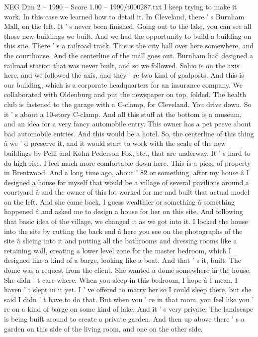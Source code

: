 \begin{textsample}{NEG Dim 2 – 1990 – Score 1.00 – 1990/t000287.txt}
I keep trying to make it work.
In this case we learned how to detail it.
In Cleveland, there ' s Burnham Mall, on the left.
It ' s never been finished.
Going out to the lake, you can see all those new buildings we built.
And we had the opportunity to build a building on this site.
There ' s a railroad track.
This is the city hall over here somewhere, and the courthouse.
And the centerline of the mall goes out.
Burnham had designed a railroad station that was never built, and so we followed.
Sohio is on the axis here, and we followed the axis, and they ' re two kind of goalposts.
And this is our building, which is a corporate headquarters for an insurance company.
We collaborated with Oldenburg and put the newspaper on top, folded.
The health club is fastened to the garage with a C-clamp, for Cleveland.
You drive down.
So it ' s about a 10-story C-clamp.
And all this stuff at the bottom is a museum, and an idea for a very fancy automobile entry.
This owner has a pet peeve about bad automobile entries.
And this would be a hotel.
So, the centerline of this thing â we ' d preserve it, and it would start to work with the scale of the new buildings by Pelli and Kohn Pederson Fox, etc., that are underway.
It ' s hard to do high-rise.
I feel much more comfortable down here.
This is a piece of property in Brentwood.
And a long time ago, about ' 82 or something, after my house â I designed a house for myself that would be a village of several pavilions around a courtyard â and the owner of this lot worked for me and built that actual model on the left.
And she came back, I guess wealthier or something â something happened â and asked me to design a house for her on this site.
And following that basic idea of the village, we changed it as we got into it.
I locked the house into the site by cutting the back end â here you see on the photographs of the site â slicing into it and putting all the bathrooms and dressing rooms like a retaining wall, creating a lower level zone for the master bedroom, which I designed like a kind of a barge, looking like a boat.
And that ' s it, built.
The dome was a request from the client.
She wanted a dome somewhere in the house.
She didn ' t care where.
When you sleep in this bedroom, I hope â I mean, I haven ' t slept in it yet.
I ' ve offered to marry her so I could sleep there, but she said I didn ' t have to do that.
But when you ' re in that room, you feel like you ' re on a kind of barge on some kind of lake.
And it ' s very private.
The landscape is being built around to create a private garden.
And then up above there ' s a garden on this side of the living room, and one on the other side.

\end{textsample}

